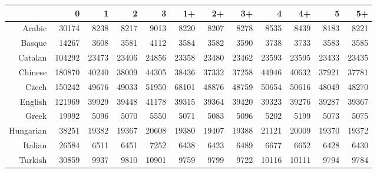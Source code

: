 \documentclass[paper=a4, fontsize=11pt]{scrartcl} %
\begin{document}
\begin{table}[ht]
\centering
\begin{tabular}{rrrrrrrrrrrr}
  \hline
 & 0 & 1 & 2 & 3 & 1+ & 2+ & 3+ & 4 & 4+ & 5 & 5+ \\ 
  \hline
Arabic & 30174 & 8238 & 8217 & 9013 & 8220 & 8207 & 8278 & 8535 & 8439 & 8183 & 8221 \\ 
  Basque & 14267 & 3608 & 3581 & 4112 & 3584 & 3582 & 3590 & 3738 & 3733 & 3583 & 3585 \\ 
  Catalan & 104292 & 23473 & 23406 & 24856 & 23358 & 23480 & 23462 & 23593 & 23595 & 23433 & 23435 \\ 
  Chinese & 180870 & 40240 & 38009 & 44305 & 38436 & 37332 & 37258 & 44946 & 40632 & 37921 & 37781 \\ 
  Czech & 150242 & 49676 & 49033 & 51950 & 68101 & 48876 & 48759 & 50654 & 50616 & 48049 & 48270 \\ 
  English & 121969 & 39929 & 39448 & 41178 & 39315 & 39364 & 39420 & 39323 & 39276 & 39287 & 39367 \\ 
  Greek & 19992 & 5096 & 5070 & 5550 & 5071 & 5083 & 5096 & 5202 & 5199 & 5073 & 5075 \\ 
  Hungarian & 38251 & 19382 & 19367 & 20608 & 19380 & 19407 & 19388 & 21121 & 20009 & 19370 & 19372 \\ 
  Italian & 26584 & 6511 & 6451 & 7252 & 6438 & 6423 & 6489 & 6677 & 6652 & 6428 & 6430 \\ 
  Turkish & 30859 & 9937 & 9810 & 10901 & 9759 & 9799 & 9722 & 10116 & 10111 & 9794 & 9784 \\ 
   \hline
\end{tabular}
\end{table}
\end{document}
